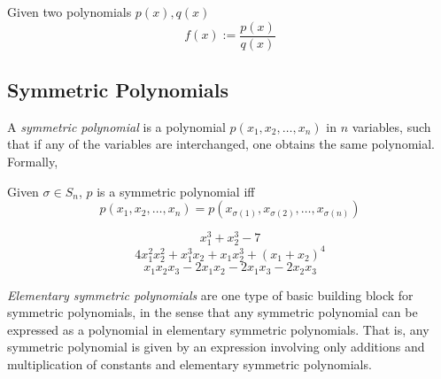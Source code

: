 \begin{definition}
   Given two polynomials \(p(x), q(x)\)
   \[f(x) := \frac{p(x)}{q(x)}\]
\end{definition}

\subsection{Symmetric Polynomials}
A \emph{symmetric polynomial} is a polynomial \(p(x_1, x_2, \ldots, x_n)\) in \(n\) variables, such that if any of the variables are interchanged, one obtains the same polynomial.
Formally,
\begin{definition}
   Given \(\sigma \in S_n\), \(p\) is a symmetric polynomial iff
   \[p(x_1, x_2, \ldots, x_n) = p(x_{\sigma(1)}, x_{\sigma(2)}, \ldots, x_{\sigma(n)})\]
\end{definition}
\begin{example}
   \[x_1^3 + x_2^3-7\]
   \[4x_1^2x_2^2 + x_1^3x_2 + x_1x_2^3 + (x_1 + x_2)^4\]
   \[x_1x_2x_3 - 2x_1x_2 - 2x_1x_3 - 2x_2x_3\]
\end{example}
\emph{Elementary symmetric polynomials} are one type of basic building block for symmetric polynomials, in the sense that any symmetric polynomial can be expressed as a polynomial in elementary symmetric polynomials.
That is, any symmetric polynomial is given by an expression involving only additions and multiplication of constants and elementary symmetric polynomials.

